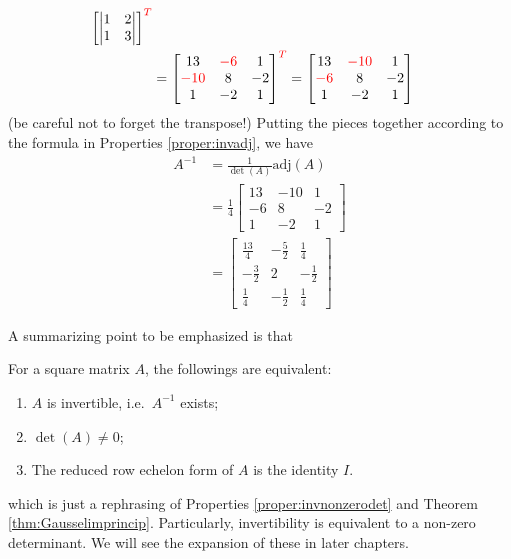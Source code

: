 \begin{solution}
\begin{align*}
\begin{bmatrix*}[r]
\begin{vmatrix}
1 & 2 \\
1 & 3 
\end{vmatrix} 
\end{bmatrix*}^{\color{red}{T}} \\
&= 
\begin{bmatrix}
13 & \textcolor{red}{-6} & 1 \\
\textcolor{red}{-10} & 8 & -2 \\
1 & -2 & 1
\end{bmatrix}^{\color{red}{T}} = 
\begin{bmatrix}
13 & \textcolor{red}{-10} & 1 \\
\textcolor{red}{-6} & 8 & -2 \\
1 & -2 & 1
\end{bmatrix}
\end{align*}
(be careful not to forget the transpose!) Putting the pieces together according to the formula in Properties \ref{proper:invadj}, we have
\begin{align*}
A^{-1} &= \frac{1}{\det(A)}\text{adj}(A) \\
&= \frac{1}{4}
\begin{bmatrix}
13 & -10 & 1 \\
-6 & 8 & -2 \\
1 & -2 & 1
\end{bmatrix} \\
&= 
\begin{bmatrix}
\frac{13}{4} & -\frac{5}{2} & \frac{1}{4} \\
-\frac{3}{2} & 2 & -\frac{1}{2} \\
\frac{1}{4} & -\frac{1}{2} & \frac{1}{4}
\end{bmatrix}
\end{align*}
\end{solution}
A summarizing point to be emphasized is that
\begin{thm}
\label{thm:equiv1}
For a square matrix $A$, the followings are equivalent:
\begin{enumerate}[label=(\alph*)]
\item $A$ is invertible, i.e.\ $A^{-1}$ exists;
\item $\det(A) \neq 0$;
\item The reduced row echelon form of $A$ is the identity $I$.
\end{enumerate}
\end{thm}
which is just a rephrasing of Properties \ref{proper:invnonzerodet} and Theorem \ref{thm:Gausselimprincip}. Particularly, invertibility is equivalent to a non-zero determinant. We will see the expansion of these  in later chapters.

